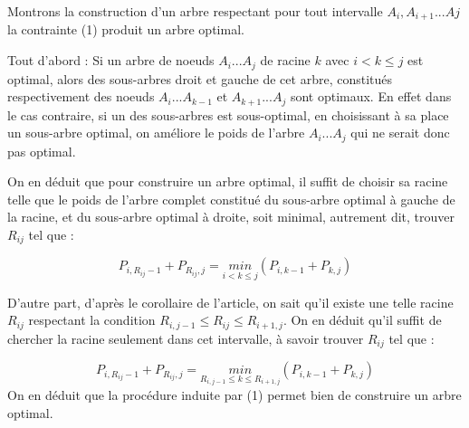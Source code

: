 \documentclass{article}
\begin{document}
Montrons la construction d'un arbre respectant pour tout intervalle $A_i, A_{i+1} ... A{j}$ la contrainte (1) produit un arbre optimal.
 
Tout d'abord :  
Si un arbre de noeuds $A_i...A_j$ de racine $k$ avec $i<k\leq j$ est optimal, alors des sous-arbres droit et gauche de cet arbre, constitués respectivement des noeuds $A_i...A_{k-1}$ et $A_{k+1}...A_j$ sont optimaux.  
En effet dans le cas contraire, si un des sous-arbres est sous-optimal, en choisissant à sa place un sous-arbre optimal, on améliore le poids de l'arbre $A_i...A_j$ qui ne serait donc pas optimal.  

On en déduit que pour construire un arbre optimal, il suffit de choisir sa racine telle que le poids de l'arbre complet constitué du sous-arbre optimal à gauche de la racine, et du sous-arbre optimal à droite, soit minimal, autrement dit, trouver $R_{ij}$ tel que : 

\begin{equation}
P_{i,R_{ij} - 1} + P_{R_{ij},j} = \underset{i<k\leq j}{min}(P_{i,k - 1} + P_{k,j})
\end{equation}

D'autre part, d'après le corollaire de l'article, on sait qu'il existe une telle racine $R_{ij}$ respectant la condition $R_{i,j-1} \leq R_{ij} \leq R_{i+1, j}$. On en déduit qu'il suffit de chercher la racine seulement dans cet intervalle, à savoir trouver $R_{ij}$ tel que : 

\begin{equation}
P_{i,R_{ij} - 1} + P_{R_{ij},j} = \underset{R_{i,j-1} \leq k \leq R_{i+1, j}}{min}(P_{i,k - 1} + P_{k,j})
\end{equation}
On en déduit que la procédure induite par (1) permet bien de construire un arbre optimal.
\end{document}
